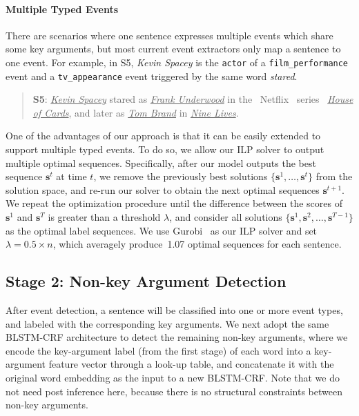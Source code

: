 \paragraph{Multiple Typed Events}
There are scenarios where one sentence expresses multiple events which share some key arguments,
but most current event extractors only map a sentence to one event.
For example, in S5, \emph{Kevin Spacey} is the \texttt{actor} of a \texttt{film\_performance} event and a \texttt{tv\_appearance} event triggered by the same word \emph{stared}.
\begin{quote}
	\textbf{S5}: \underline{\emph{Kevin Spacey}} stared as  \underline{\emph{Frank Underwood}} in  the  Netflix  series     \underline{\emph{House of Cards}}, and later as \underline{\emph{Tom Brand}} in \underline{\emph{Nine Lives}}.
\end{quote}
One of the advantages of our approach is that it can be easily extended to support multiple typed events.
To do so, we allow our ILP solver to output multiple optimal sequences. Specifically, after our model outputs the best sequence $\bm{s}^t$
at time $t$, we remove the previously best solutions
 $\{\bm{s}^1, \ldots, \bm{s}^{t}\}$ from the solution space, and re-run our solver to obtain the next optimal sequences $\bm{s}^{t+1}$.
We repeat the optimization procedure until the difference between the scores of $\bm{s}^1$ and $\bm{s}^T$ is greater
than a threshold $\lambda$, and consider all solutions $\{\bm{s}^1, \bm{s}^2, \ldots, \bm{s}^{T-1}\}$ as the optimal label sequences.
We use Gurobi~\cite{gurobi} as our ILP solver and set $\lambda=0.5 \times n$, which averagely produce~1.07 optimal sequences for each sentence.

\subsection{Stage 2: Non-key Argument Detection}
After event detection, a sentence will be classified into one or more event types, and labeled with the corresponding key arguments.
%
We next adopt the same BLSTM-CRF architecture %
to detect the remaining non-key arguments, where we encode the key-argument label (from the first stage) %
of each word into a key-argument feature vector through a look-up table, and concatenate it with the original word
embedding as the input to a new BLSTM-CRF. Note that we do not need post inference here, because there is no structural constraints between non-key arguments.
